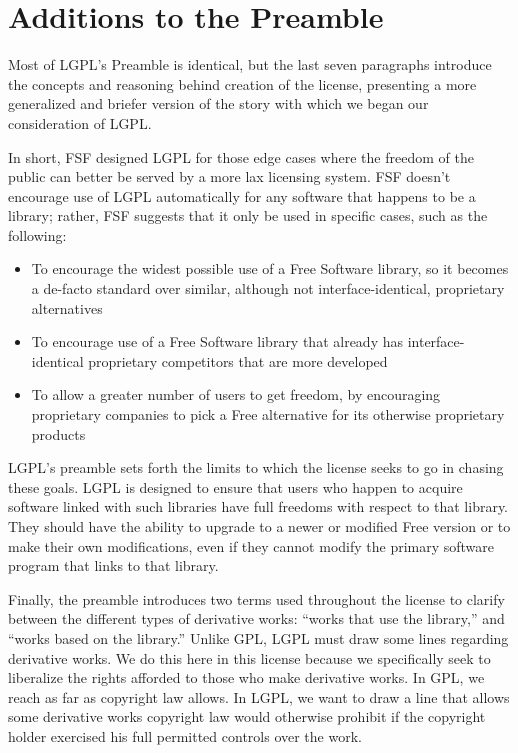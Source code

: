 \section{Additions to the Preamble}

Most of LGPL's Preamble is identical, but the last seven paragraphs
introduce the concepts and reasoning behind creation of the license,
presenting a more generalized and briefer version of the story with which
we began our consideration of LGPL\@.

In short, FSF designed LGPL for those edge cases where the freedom of the
public can better be served by a more lax licensing system. FSF doesn't
encourage use of LGPL automatically for any software that happens to be a
library; rather, FSF suggests that it only be used in specific cases, such
as the following:

\begin{itemize}

\item To encourage the widest possible use of a Free Software library, so
  it becomes a de-facto standard over similar, although not
  interface-identical, proprietary alternatives

\item To encourage use of a Free Software library that already has
  interface-identical proprietary competitors that are more developed

\item To allow a greater number of users to get freedom, by encouraging
  proprietary companies to pick a Free alternative for its otherwise
  proprietary products

\end{itemize}

LGPL's preamble sets forth the limits to which the license seeks to go in
chasing these goals. LGPL is designed to ensure that users who happen to
acquire software linked with such libraries have full freedoms with
respect to that library. They should have the ability to upgrade to a newer
or modified Free version or to make their own modifications, even if they
cannot modify the primary software program that links to that library.

Finally, the preamble introduces two terms used throughout the license to
clarify between the different types of derivative works: ``works that use
the library,'' and ``works based on the library.''  Unlike GPL, LGPL must
draw some lines regarding derivative works. We do this here in this
license because we specifically seek to liberalize the rights afforded to
those who make derivative works. In GPL, we reach as far as copyright law
allows. In LGPL, we want to draw a line that allows some derivative works
copyright law would otherwise prohibit if the copyright holder exercised
his full permitted controls over the work.

